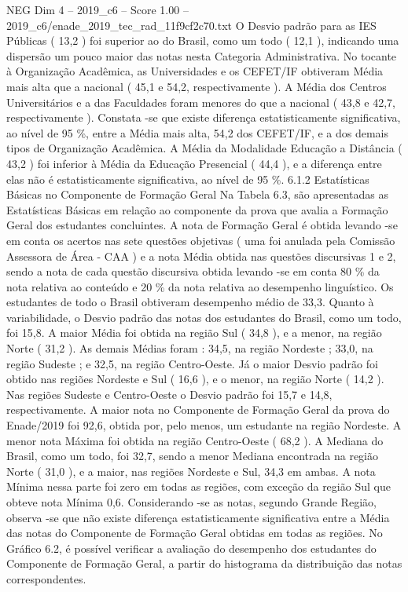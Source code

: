 \begin{textsample}{NEG Dim 4 – 2019\_c6 – Score 1.00 – 2019\_c6/enade\_2019\_tec\_rad\_11f9cf2c70.txt}
O Desvio padrão para as IES Públicas ( 13,2 ) foi superior ao do Brasil, como um todo ( 12,1 ), indicando uma dispersão um pouco maior das notas nesta Categoria Administrativa.
No tocante à Organização Acadêmica, as Universidades e os CEFET/IF obtiveram Média mais alta que a nacional ( 45,1 e 54,2, respectivamente ).
A Média dos Centros Universitários e a das Faculdades foram menores do que a nacional ( 43,8 e 42,7, respectivamente ).
Constata -se que existe diferença estatisticamente significativa, ao nível de 95 \%, entre a Média mais alta, 54,2 dos CEFET/IF, e a dos demais tipos de Organização Acadêmica.
A Média da Modalidade Educação a Distância ( 43,2 ) foi inferior à Média da Educação Presencial ( 44,4 ), e a diferença entre elas não é estatisticamente significativa, ao nível de 95 \%. 6.1.2 Estatísticas Básicas no Componente de Formação Geral Na Tabela 6.3, são apresentadas as Estatísticas Básicas em relação ao componente da prova que avalia a Formação Geral dos estudantes concluintes.
A nota de Formação Geral é obtida levando -se em conta os acertos nas sete questões objetivas ( uma foi anulada pela Comissão Assessora de Área - CAA ) e a nota Média obtida nas questões discursivas 1 e 2, sendo a nota de cada questão discursiva obtida levando -se em conta 80 \% da nota relativa ao conteúdo e 20 \% da nota relativa ao desempenho linguístico.
Os estudantes de todo o Brasil obtiveram desempenho médio de 33,3.
Quanto à variabilidade, o Desvio padrão das notas dos estudantes do Brasil, como um todo, foi 15,8.
A maior Média foi obtida na região Sul ( 34,8 ), e a menor, na região Norte ( 31,2 ).
As demais Médias foram : 34,5, na região Nordeste ; 33,0, na região Sudeste ; e 32,5, na região Centro-Oeste.
Já o maior Desvio padrão foi obtido nas regiões Nordeste e Sul ( 16,6 ), e o menor, na região Norte ( 14,2 ).
Nas regiões Sudeste e Centro-Oeste o Desvio padrão foi 15,7 e 14,8, respectivamente.
A maior nota no Componente de Formação Geral da prova do Enade/2019 foi 92,6, obtida por, pelo menos, um estudante na região Nordeste.
A menor nota Máxima foi obtida na região Centro-Oeste ( 68,2 ).
A Mediana do Brasil, como um todo, foi 32,7, sendo a menor Mediana encontrada na região Norte ( 31,0 ), e a maior, nas regiões Nordeste e Sul, 34,3 em ambas.
A nota Mínima nessa parte foi zero em todas as regiões, com exceção da região Sul que obteve nota Mínima 0,6.
Considerando -se as notas, segundo Grande Região, observa -se que não existe diferença estatisticamente significativa entre a Média das notas do Componente de Formação Geral obtidas em todas as regiões.
No Gráfico 6.2, é possível verificar a avaliação do desempenho dos estudantes do Componente de Formação Geral, a partir do histograma da distribuição das notas correspondentes.

\end{textsample}
